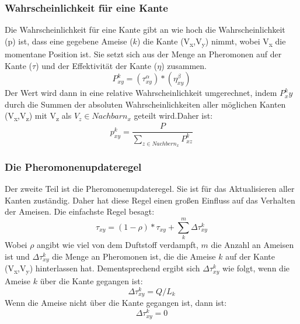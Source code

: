 \documentclass[12pt]{article}
\begin{document}
\subsubsection{Wahrscheinlichkeit für eine Kante}\label{P/p}
Die Wahrscheinlichkeit für eine Kante gibt an wie hoch die Wahrscheinlichkeit (p) ist, dass eine gegebene Ameise ($k$) die Kante (V\textsubscript{x},V\textsubscript{y}) nimmt, wobei V\textsubscript{x} die momentane Position ist. Sie setzt sich aus der Menge an Pheromonen auf der Kante ($\tau$) und der Effektivität der Kante ($\eta$) zusammen. \[ P ^{ k }_{ xy }=\left(  \tau ^{ \alpha }_{ xy } \right)*\left(  \eta ^{ \beta }_{ xy } \right)\]
Der Wert wird dann in eine relative Wahrscheinlichkeit umgerechnet, indem $P^k_xy$ durch die Summen der absoluten Wahrscheinlichkeiten aller möglichen Kanten (V\textsubscript{x},V\textsubscript{z}) mit V\textsubscript{z} als $V_z \in Nachbarn_{x}$ geteilt wird.Daher ist: \[p^{k}_{xy}=\frac{P}{\sum_{z\in Nachbern_x}{}P^{k }_{xz}} \]
\subsubsection{Die Pheromonenupdateregel}
Der zweite Teil ist die Pheromonenupdateregel. Sie ist für das Aktualisieren aller Kanten zuständig. Daher hat diese Regel einen großen Einfluss auf das Verhalten der Ameisen. Die einfachste Regel besagt: \[\tau_{xy}= (1-\rho)*\tau_{xy}+\sum_{k}^{m}{ \Delta\tau^k_{xy}} \]
Wobei $\rho$ angibt wie viel von dem Duftstoff verdampft, $m$ die Anzahl an Ameisen ist und $\Delta\tau^k_{xy}$ die Menge an Pheromonen ist, die die Ameise $k$ auf der Kante (V\textsubscript{x},V\textsubscript{y}) hinterlassen hat. Dementsprechend ergibt sich $\Delta\tau^k_{xy}$ wie folgt, wenn die Ameise $k$ über die Kante gegangen ist:\[\Delta\tau^k_{xy}=Q/L_k\] Wenn die Ameise nicht über die Kante gegangen ist, dann ist: \[\Delta\tau^k_{xy}=0\]
\end{document}
